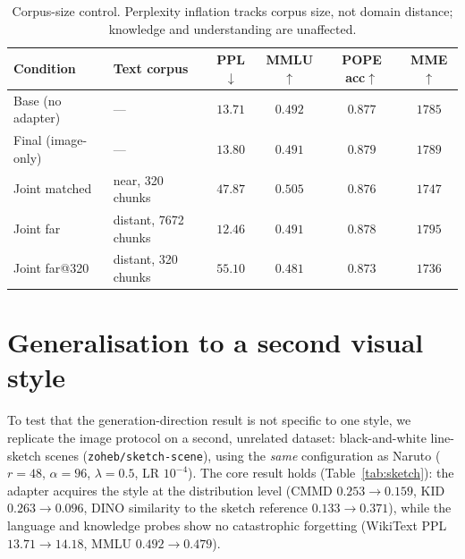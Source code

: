 \begin{table}[t]
\centering\small
\setlength{\tabcolsep}{6pt}
\begin{tabular}{llcccc}
\toprule
\textbf{Condition} & \textbf{Text corpus} & \textbf{PPL}$\downarrow$ & \textbf{MMLU}$\uparrow$ & \textbf{POPE acc}$\uparrow$ & \textbf{MME}$\uparrow$ \\
\midrule
Base (no adapter) & ---                  & $13.71$ & $0.492$ & $0.877$ & $1785$ \\
Final (image-only)& ---                  & $13.80$ & $0.491$ & $0.879$ & $1789$ \\
Joint matched     & near, 320 chunks     & $47.87$ & $0.505$ & $0.876$ & $1747$ \\
Joint far         & distant, 7672 chunks & $12.46$ & $0.491$ & $0.878$ & $1795$ \\
Joint far@320     & distant, 320 chunks  & $55.10$ & $0.481$ & $0.873$ & $1736$ \\
\bottomrule
\end{tabular}
\caption{Corpus-size control. Perplexity inflation tracks corpus size, not domain
distance; knowledge and understanding are unaffected.}
\label{tab:joint}
\end{table}


\section{Generalisation to a second visual style}
\label{app:sketch}
To test that the generation-direction result is not specific to one style, we
replicate the image protocol on a second, unrelated dataset: black-and-white
line-sketch scenes (\texttt{zoheb/sketch-scene}), using the \emph{same}
configuration as Naruto ($r{=}48$, $\alpha{=}96$, $\lambda{=}0.5$, LR
$10^{-4}$). The core result holds (Table~\ref{tab:sketch}): the adapter acquires
the style at the distribution level (CMMD $0.253\!\to\!0.159$, KID
$0.263\!\to\!0.096$, DINO similarity to the sketch reference
$0.133\!\to\!0.371$), while the language and knowledge probes show no
catastrophic forgetting (WikiText PPL $13.71\!\to\!14.18$, MMLU
$0.492\!\to\!0.479$).

